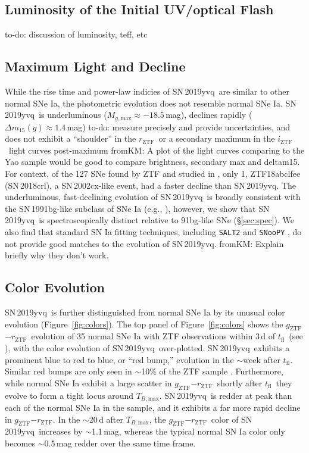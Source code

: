 \documentclass[twocolumn]{aastex63}
\newcommand{\fromkate}[1]{{\color{brown} fromKM: {#1}}}
\newcommand{\todo}[1]{{\color{magenta} to-do: {#1}}}
\newcommand{\rztf}{$r_\mathrm{ZTF}$}
\newcommand{\gztf}{$g_\mathrm{ZTF}$}
\newcommand{\iztf}{$i_\mathrm{ZTF}$}
\newcommand{\tfl}{$t_\mathrm{fl}$}
\newcommand{\tbmax}{$T_{B,\mathrm{max}}$}
\newcommand{\sn}{SN\,2019yvq}
\begin{document}
\subsection{Luminosity of the Initial UV/optical Flash}

\todo{discussion of luminosity, teff, etc}

\subsection{Maximum Light and Decline}

While the rise time and power-law indicies of \sn\ are similar to other
normal SNe Ia, the photometric evolution does not resemble normal SNe Ia.
\sn\ is underluminous ($M_{g,\mathrm{max}} \approx -18.5$\,mag), declines
rapidly ($\Delta m_{15}(g) \approx 1.4$\,mag) \todo{measure precisely and
provide uncertainties}, and does not exhibit a ``shoulder'' in the \rztf\ or a
secondary maximum in the \iztf\ light curves post-maximum \fromkate{A plot of the light curves comparing to the Yao sample would be good to compare brightness, secondary max and deltam15}. For context, of
the 127 SNe found by ZTF and studied in \citet{Yao19}, only 1, ZTF18abclfee
(SN\,2018crl), a SN\,2002cx-like event, had a faster decline than \sn. The
underluminous, fast-declining evolution of \sn\ is broadly consistent with
the SN\,1991bg-like subclass of SNe Ia (e.g., \citealt{Taubenberger17}),
however, we show that \sn\ is spectroscopically distinct relative to
91bg-like SNe (\S\ref{sec:spec}). We also find that standard SN Ia fitting
techniques, including \texttt{SALT2} \citep{Guy07} and \texttt{SNooPY}
\citep{Burns11}, do not provide good matches to the evolution of \sn. \fromkate{Explain briefly why they don't work.}

\subsection{Color Evolution}

\sn\ is further distinguished from normal SNe Ia by its unusual color
evolution (Figure~\ref{fig:colors}). The top panel of Figure~\ref{fig:colors}
shows the \gztf$ - $\rztf\ evolution of 35 normal SNe Ia with ZTF
observations within 3\,d of \tfl\ (see \citealt{Bulla20}), with the color
evolution of \sn\ over-plotted. \sn\ exhibits a prominent blue to red to
blue, or ``red bump,'' evolution in the $\sim$week after \tfl. Similar red
bumps are only seen in $\sim$10\% of the ZTF sample \citep{Bulla20}.
Furthermore, while normal SNe Ia exhibit a large scatter in \gztf$ - $\rztf\
shortly after \tfl\ they evolve to form a tight locus around \tbmax. \sn\ is redder at peak than each of the normal SNe Ia in the \citet{Bulla20} sample,
and it exhibits a far more rapid decline in \gztf$ - $\rztf. In the
$\sim$20\,d after \tbmax, the \gztf$ - $\rztf\ color of \sn\ increases by
$\sim$1.1\,mag, whereas the typical normal SN Ia color only becomes
$\sim$0.5\,mag redder over the same time frame. 
\end{document}
